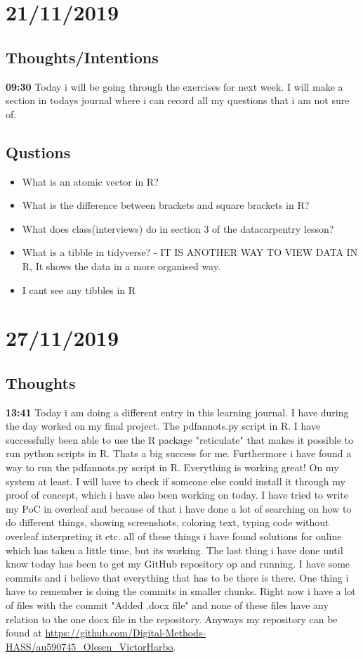 \documentclass{article}
\begin{document}
\section{21/11/2019}
\subsection{Thoughts/Intentions}
\textbf{09:30} Today i will be going through the exercises for next week. I will make a section in todays journal where i can record all my questions that i am not sure of.
\subsection{Qustions}
\begin{itemize}
    \item What is an atomic vector in R?
    \item What is the difference between brackets and square brackets in R?
    \item What does class(interviews) do in section 3 of the datacarpentry lesson?
    \item What is a tibble in tidyverse? - IT IS ANOTHER WAY TO VIEW DATA IN R, It shows the data in a more organised way.
    \item I cant see any tibbles in R 
\end{itemize}

\section{27/11/2019}
\subsection{Thoughts}
\textbf{13:41} Today i am doing a different entry in this learning journal. I have during the day worked on my final project. The pdfannots.py script in R. I have successfully been able to use the R package "reticulate" that makes it possible to run python scripts in R. Thats a big success for me. Furthermore i have found a way to run the pdfannots.py script in R. Everything is working great! On my system at least. I will have to check if someone else could install it through my proof of concept, which i have also been working on today. I have tried to write my PoC in overleaf and because of that i have done a lot of searching on how to do different things, showing screenshots, coloring text, typing code without overleaf interpreting it etc. all of these things i have found solutions for online which has taken a little time, but its working. The last thing i have done until know today has been to get my GitHub repository op and running. I have some commits and i believe that everything that has to be there is there. One thing i have to remember is doing the commits in smaller chunks. Right now i have a lot of files with the commit "Added .docx file" and none of these files have any relation to the one docx file in the repository. Anyways my repository can be found at \url{https://github.com/Digital-Methods-HASS/au590745_Olesen_VictorHarbo}.
\end{document}
